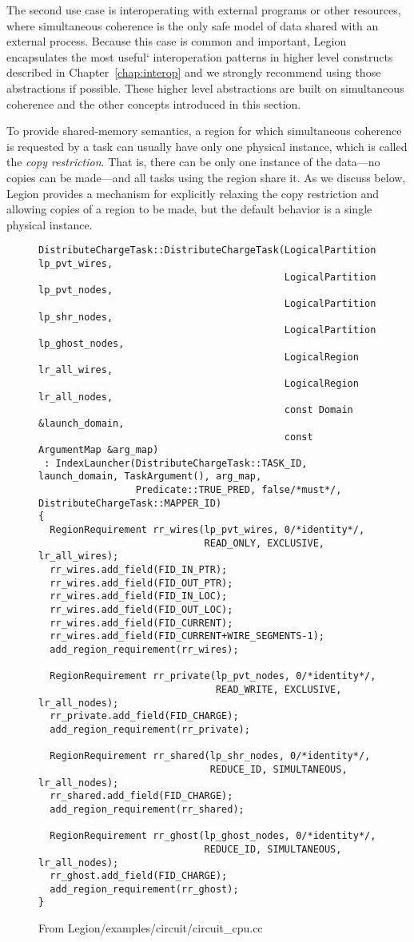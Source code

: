 The second use case is interoperating with external programs or other resources, where simultaneous coherence is the only safe model of data shared with an external process.
Because this case is common and important, Legion encapsulates the most useful` interoperation patterns in higher level constructs described in Chapter~\ref{chap:interop} and we strongly
recommend using those abstractions if possible.
These higher level abstractions are built on simultaneous coherence and the other concepts introduced in this section.

To provide shared-memory semantics, a region for which simultaneous
coherence is requested by a task can usually have only one physical instance,
which is called the {\em copy restriction}.  That is, there can be only
one instance of the data---no copies can be made---and all tasks using the
region share it.  As we discuss below, Legion provides a mechanism for
explicitly relaxing the copy restriction and allowing copies of a
region to be made, but the default behavior is a single physical
instance.  

\begin{figure}
  {\small
\begin{lstlisting}
DistributeChargeTask::DistributeChargeTask(LogicalPartition lp_pvt_wires,
                                           LogicalPartition lp_pvt_nodes,
                                           LogicalPartition lp_shr_nodes,
                                           LogicalPartition lp_ghost_nodes,
                                           LogicalRegion lr_all_wires,
                                           LogicalRegion lr_all_nodes,
                                           const Domain &launch_domain,
                                           const ArgumentMap &arg_map)
 : IndexLauncher(DistributeChargeTask::TASK_ID, launch_domain, TaskArgument(), arg_map,
                 Predicate::TRUE_PRED, false/*must*/, DistributeChargeTask::MAPPER_ID)
{
  RegionRequirement rr_wires(lp_pvt_wires, 0/*identity*/,
                             READ_ONLY, EXCLUSIVE, lr_all_wires);
  rr_wires.add_field(FID_IN_PTR);
  rr_wires.add_field(FID_OUT_PTR);
  rr_wires.add_field(FID_IN_LOC);
  rr_wires.add_field(FID_OUT_LOC);
  rr_wires.add_field(FID_CURRENT);
  rr_wires.add_field(FID_CURRENT+WIRE_SEGMENTS-1);
  add_region_requirement(rr_wires);

  RegionRequirement rr_private(lp_pvt_nodes, 0/*identity*/,
                               READ_WRITE, EXCLUSIVE, lr_all_nodes);
  rr_private.add_field(FID_CHARGE);
  add_region_requirement(rr_private);

  RegionRequirement rr_shared(lp_shr_nodes, 0/*identity*/,
                              REDUCE_ID, SIMULTANEOUS, lr_all_nodes);
  rr_shared.add_field(FID_CHARGE);
  add_region_requirement(rr_shared);

  RegionRequirement rr_ghost(lp_ghost_nodes, 0/*identity*/,
                             REDUCE_ID, SIMULTANEOUS, lr_all_nodes);
  rr_ghost.add_field(FID_CHARGE);
  add_region_requirement(rr_ghost);
}
\end{lstlisting}
  }
  \caption{From Legion/examples/circuit/circuit\_cpu.cc}
  \label{fig:simul}
\end{figure}

